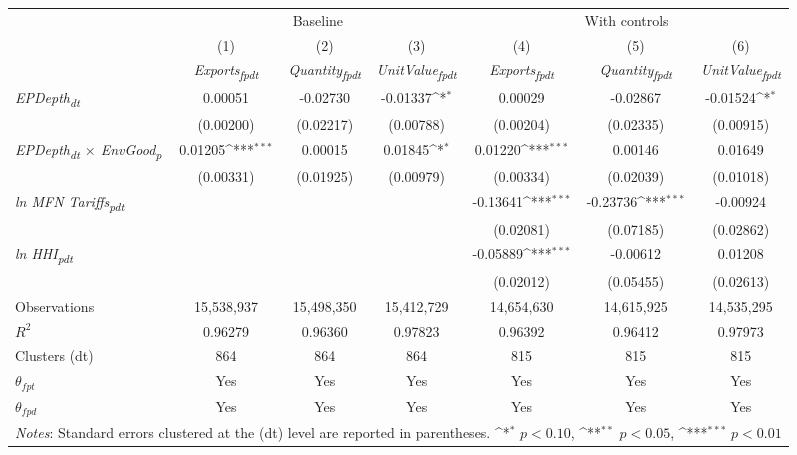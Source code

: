 {
\def\sym#1{\ifmmode^{#1}\else\(^{#1}\)\fi}
\begin{tabular}{l*{6}{c}}
\toprule
&\multicolumn{3}{c}{Baseline}&\multicolumn{3}{c}{With controls}\\\cmidrule(lr){2-4}\cmidrule(lr){5-7}
&(1)&(2)&(3)&(4)&(5)&(6)\\
&\textit{Exports\textsubscript{fpdt}}&\textit{Quantity\textsubscript{fpdt}}&\textit{UnitValue\textsubscript{fpdt}}&\textit{Exports\textsubscript{fpdt}}&\textit{Quantity\textsubscript{fpdt}}&\textit{UnitValue\textsubscript{fpdt}}\\
\midrule
\textit{EPDepth\textsubscript{dt}} & 0.00051 & -0.02730 & -0.01337\sym{*} & 0.00029 & -0.02867 & -0.01524\sym{*}\\
 & (0.00200) & (0.02217) & (0.00788) & (0.00204) & (0.02335) & (0.00915)\\
\addlinespace
\textit{EPDepth\textsubscript{dt} $\times$ EnvGood\textsubscript{p}} & 0.01205\sym{***} & 0.00015 & 0.01845\sym{*} & 0.01220\sym{***} & 0.00146 & 0.01649\\
 & (0.00331) & (0.01925) & (0.00979) & (0.00334) & (0.02039) & (0.01018)\\
\addlinespace
\textit{ln MFN Tariffs\textsubscript{pdt}} &  &  &  & -0.13641\sym{***} & -0.23736\sym{***} & -0.00924\\
 &  &  &  & (0.02081) & (0.07185) & (0.02862)\\
\addlinespace
\textit{ln HHI\textsubscript{pdt}} &  &  &  & -0.05889\sym{***} & -0.00612 & 0.01208\\
 &  &  &  & (0.02012) & (0.05455) & (0.02613)\\
\midrule
Observations & 15,538,937 & 15,498,350 & 15,412,729 & 14,654,630 & 14,615,925 & 14,535,295\\
$R^{2}$ & 0.96279 & 0.96360 & 0.97823 & 0.96392 & 0.96412 & 0.97973\\
Clusters (dt) & 864 & 864 & 864 & 815 & 815 & 815\\
$\theta_{fpt}$ & Yes & Yes & Yes & Yes & Yes & Yes\\
$\theta_{fpd}$ & Yes & Yes & Yes & Yes & Yes & Yes\\
\bottomrule
\multicolumn{7}{l}{\footnotesize \textit{Notes}: Standard errors clustered at the (dt) level are reported in parentheses. \sym{*} \(p<0.10\), \sym{**} \(p<0.05\), \sym{***} \(p<0.01\)}\\
\end{tabular}
}
